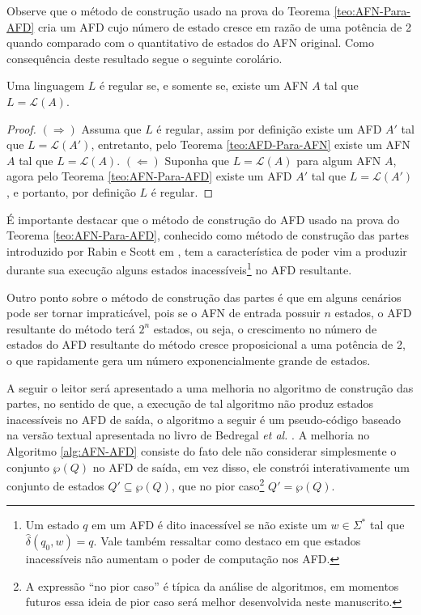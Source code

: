 Observe que o método de construção usado na prova do Teorema \ref{teo:AFN-Para-AFD} cria um AFD cujo número de estado cresce em razão de uma potência de 2 quando comparado com o quantitativo de estados do AFN original. Como consequência deste resultado segue o seguinte corolário.

\begin{corollary}
	Uma linguagem $L$ é regular se, e somente se, existe um AFN $A$ tal que $L = \mathcal{L}(A)$.
\end{corollary}

\begin{proof}
	$(\Rightarrow)$ Assuma que $L$ é regular, assim por definição existe um AFD $A'$ tal que $L = \mathcal{L}(A')$, entretanto, pelo Teorema \ref{teo:AFD-Para-AFN} existe um AFN $A$ tal que $L = \mathcal{L}(A)$. $(\Leftarrow)$ Suponha que $L = \mathcal{L}(A)$ para algum AFN $A$, agora pelo Teorema \ref{teo:AFN-Para-AFD} existe um AFD $A'$ tal que $L = \mathcal{L}(A')$, e portanto, por definição $L$ é regular.
\end{proof}

É importante destacar que o método de construção do AFD usado na prova do Teorema \ref{teo:AFN-Para-AFD}, conhecido como método de construção das partes introduzido por Rabin e Scott em \cite{rabin1959}, tem a característica de poder vim a produzir durante sua execução alguns estados inacessíveis\footnote{Um estado $q$ em um AFD é dito inacessível se não existe um $w \in \Sigma^*$ tal que $\widehat{\delta}(q_0, w) = q$. Vale também ressaltar como destaco em \cite{benjaLivro2010, hopcroft2008} que estados inacessíveis não aumentam o poder de computação nos AFD.} no AFD resultante. 

Outro ponto sobre o método de construção das partes é que em alguns cenários pode ser tornar impraticável, pois se o AFN de entrada possuir $n$ estados, o AFD resultante do método terá $2^n$ estados, ou seja, o crescimento no número de estados do AFD resultante do método cresce proposicional a uma potência de 2, o que rapidamente gera um número exponencialmente grande de estados. 

A seguir o leitor será apresentado a uma melhoria no algoritmo de construção das partes, no sentido de que, a execução de tal algoritmo não produz estados inacessíveis no AFD de saída, o algoritmo a seguir é um pseudo-código baseado na versão textual apresentada no livro de Bedregal \textit{et al.} \cite{benjaLivro2010}. A melhoria no Algoritmo \ref{alg:AFN-AFD} consiste do fato dele não considerar simplesmente o conjunto $\wp(Q)$ no AFD de saída, em vez disso, ele constrói interativamente um conjunto de estados $Q' \subseteq \wp(Q)$, que no pior caso\footnote{A expressão ``no pior caso'' é típica da análise de algoritmos, em momentos futuros essa ideia de pior caso será melhor desenvolvida neste manuscrito.} $Q' = \wp(Q)$.

